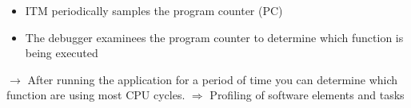 \begin{itemize}
    \item ITM periodically samples the program counter (PC)
    \item The debugger examinees the program counter to determine which function is being executed
\end{itemize}
$\rightarrow$ After running the application for a period of time you can determine which function are using most CPU cycles.
$\Rightarrow$ Profiling of software elements and tasks

